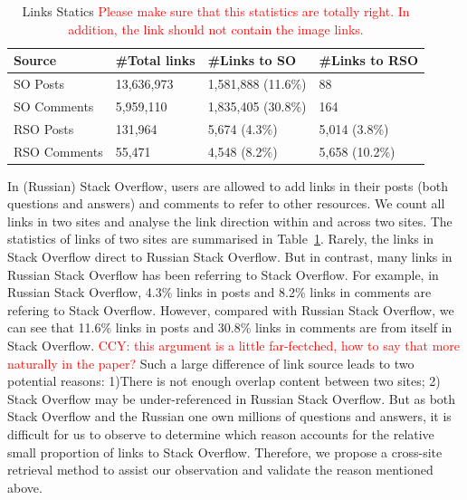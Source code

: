 \begin{table}
	\caption{Links Statics \textcolor{red}{Please make sure that this statistics are totally right. In addition, the link should not contain the image links.}}
	\centering
	\small
	\label{tab:links}
	\begin{tabular}{llll}
       \hline
		Source       &\#Total links & \#Links to SO   & \#Links to RSO\\ \hline
		SO Posts     & 13,636,973    & 1,581,888 (11.6\%)      & 88 \\
		SO Comments  & 5,959,110     & 1,835,405 (30.8\%)    & 164\\
		RSO Posts    & 131,964       & 5,674  (4.3\%)        & 5,014 (3.8\%) \\
		RSO Comments & 55,471        & 4,548  (8.2\%)        & 5,658 (10.2\%) \\
       \hline
	\end{tabular}

\end{table}	

In (Russian) Stack Overflow, users are allowed to add links in their posts (both questions and answers) and comments to refer to other resources. 
We count all links in two sites and analyse the link direction within and across two sites.
The statistics of links of two sites are summarised in Table~\ref{tab:links}.
Rarely, the links in Stack Overflow direct to Russian Stack Overflow.
But in contrast, many links in Russian Stack Overflow has been referring to Stack Overflow.
For example, in Russian Stack Overflow, 4.3\% links in posts and 8.2\% links in comments are refering to Stack Overflow.
However, compared with Russian Stack Overflow, we can see that 11.6\% links in posts and 30.8\% links in comments are from itself in Stack Overflow.
\textcolor{red}{CCY: this argument is a little far-fectched, how to say that more naturally in the paper?}
Such a large difference of link source leads to two potential reasons: 1)There is not enough overlap content between two sites; 2) Stack Overflow may be under-referenced in Russian Stack Overflow.
But as both Stack Overflow and the Russian one own millions of questions and answers, it is difficult for us to observe to determine which reason accounts for the relative small proportion of links to Stack Overflow.
Therefore, we propose a cross-site retrieval method to assist our observation and validate the reason mentioned above.
 
